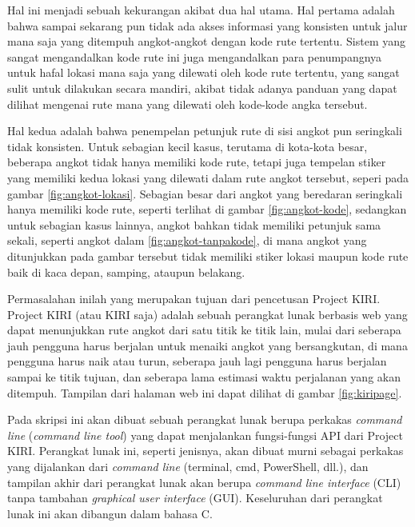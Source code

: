 \documentclass[a4paper,twoside]{article}
\begin{document}
Hal ini menjadi sebuah kekurangan akibat dua hal utama. Hal pertama adalah bahwa sampai sekarang pun tidak ada akses informasi yang konsisten untuk jalur mana saja yang ditempuh angkot-angkot dengan kode rute tertentu. Sistem yang sangat mengandalkan kode rute ini juga mengandalkan para penumpangnya untuk hafal lokasi mana saja yang dilewati oleh kode rute tertentu, yang sangat sulit untuk dilakukan secara mandiri, akibat tidak adanya panduan yang dapat dilihat mengenai rute mana yang dilewati oleh kode-kode angka tersebut.

Hal kedua adalah bahwa penempelan petunjuk rute di sisi angkot pun seringkali tidak konsisten. Untuk sebagian kecil kasus, terutama di kota-kota besar, beberapa angkot tidak hanya memiliki kode rute, tetapi juga tempelan stiker yang memiliki kedua lokasi yang dilewati dalam rute angkot tersebut, seperi pada gambar \ref{fig:angkot-lokasi}. Sebagian besar dari angkot yang beredaran seringkali hanya memiliki kode rute, seperti terlihat di gambar \ref{fig:angkot-kode}, sedangkan untuk sebagian kasus lainnya, angkot bahkan tidak memiliki petunjuk sama sekali, seperti angkot dalam \ref{fig:angkot-tanpakode}, di mana angkot yang ditunjukkan pada gambar tersebut tidak memiliki stiker lokasi maupun kode rute baik di kaca depan, samping, ataupun belakang.

Permasalahan inilah yang merupakan tujuan dari pencetusan Project KIRI. Project KIRI (atau KIRI saja) adalah sebuah perangkat lunak berbasis web yang dapat menunjukkan rute angkot dari satu titik ke titik lain, mulai dari seberapa jauh pengguna harus berjalan untuk menaiki angkot yang bersangkutan, di mana pengguna harus naik atau turun, seberapa jauh lagi pengguna harus berjalan sampai ke titik tujuan, dan seberapa lama estimasi waktu perjalanan yang akan ditempuh. Tampilan dari halaman web ini dapat dilihat di gambar \ref{fig:kiripage}.

Pada skripsi ini akan dibuat sebuah perangkat lunak berupa perkakas \textit{command line} (\textit{command line tool}) yang dapat menjalankan fungsi-fungsi API dari Project KIRI. Perangkat lunak ini, seperti jenisnya, akan dibuat murni sebagai perkakas yang dijalankan dari \textit{command line} (terminal, cmd, PowerShell, dll.), dan tampilan akhir dari perangkat lunak akan berupa \textit{command line interface} (CLI) tanpa tambahan \textit{graphical user interface} (GUI). Keseluruhan dari perangkat lunak ini akan dibangun dalam bahasa C.
\end{document}
